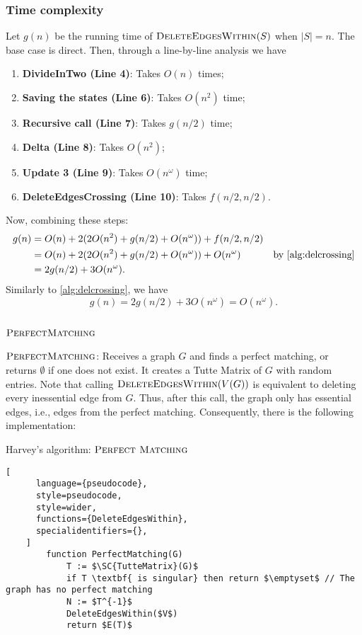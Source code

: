 \subsubsection{Time complexity}
\noindent
Let \(g(n)\) be the running time of \(\textsc{DeleteEdgesWithin}(S)\) when \(|S| = n\).
The base case is direct.
Then, through a line-by-line analysis we have
\begin{enumerate}
  \item \textbf{DivideInTwo (Line 4)}: Takes \(O(n)\) times;
  \item \textbf{Saving the states (Line 6)}: Takes \(O(n^2)\) time;
  \item \textbf{Recursive call (Line 7)}: Takes \(g(n/2)\) time;
  \item \textbf{Delta (Line 8)}: Takes \(O(n^2)\);
  \item \textbf{Update 3 (Line 9)}: Takes \(O(n^\omega)\) time;
  \item \textbf{DeleteEdgesCrossing (Line 10)}: Takes \(f(n/2, n/2)\).
\end{enumerate}
Now, combining these steps:
\begin{align*}
    g(n) &= O(n) + 2 (2O(n^2) + g(n / 2) + O(n^\omega)) + f(n/2, n/2) &  \\
    &= O(n) + 2 (2O(n^2) + g(n / 2) + O(n^\omega)) + O(n^\omega) & \text{by \ref{alg:delcrossing}} \\
    &= 2g(n / 2) + 3O(n^\omega).
\end{align*}
Similarly to \cref{alg:delcrossing}, we have
\begin{equation}
\label{alg:delwithin}
  g(n) = 2g(n / 2) + 3O(n^\omega) = O(n^\omega).
\end{equation}

\subsection{\(\SC{PerfectMatching}\)}

\(\SC{PerfectMatching}\): Receives a graph \(G\) and finds a perfect matching, or returns \(\emptyset\) if one does not exist.
It creates a Tutte Matrix of \(G\) with random entries.
Note that calling \(\textsc{DeleteEdgesWithin}(V(G))\) is equivalent to deleting every inessential edge from \(G\).
Thus, after this call, the graph only has essential edges, i.e., edges from the perfect matching. 
Consequently, there is the following implementation:

\begin{programruledcaption}{Harvey's algorithm: \(\SC{Perfect Matching}\)}
    \begin{lstlisting}[
      language={pseudocode},
      style=pseudocode,
      style=wider,
      functions={DeleteEdgesWithin},
      specialidentifiers={},
    ]
        function PerfectMatching(G)
            T := $\SC{TutteMatrix}(G)$
            if T \textbf{ is singular} then return $\emptyset$ // The graph has no perfect matching
            N := $T^{-1}$
            DeleteEdgesWithin($V$)
            return $E(T)$
    \end{lstlisting}
\end{programruledcaption}

